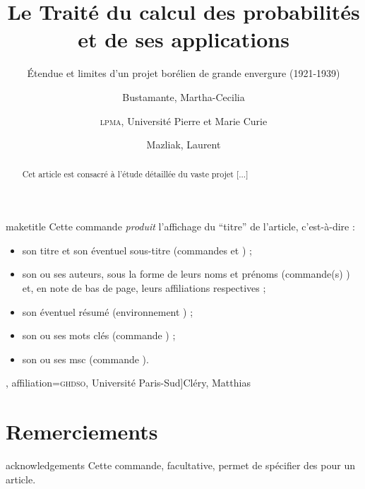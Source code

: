 \documentclass[french,nolocaltoc]{nwejmart}
\newtheorem[style=definition]{fait}
\newtheorem[title=contraventionnalisation]{ctrv}
\newtheorem[title-plural=anneaux]{anneau}
\newtheorem[title-plural=idéaux]{idéal}
\begin{document}
\begin{docCommand}[doc description=\mandatory]{maketitle}{}
  Cette commande \emph{produit} l'affichage du \enquote{titre} de l'article,
  c'est-à-dire :
  \begin{itemize}
  \item son titre et son éventuel sous-titre (commandes  et
    ) ;
  \item son ou ses auteurs, sous la forme de leurs noms et prénoms (commande(s)
    ) et, en note de bas de page, leurs affiliations respectives ;
  \item son éventuel résumé (environnement ) ;
  \item son ou ses mots clés (commande ) ;
  \item son ou ses \acrshort{msc} (commande ).
  \end{itemize}
\end{docCommand}

\begin{bodycode}[listing options={deletekeywords={[2]title,article},deletekeywords={[5]keywords}}]
\title[Le Traité du calcul des probabilités]{Le Traité du calcul des
  probabilités et de ses applications}
\subtitle[Étendue et limites d'un projet borélien]{Étendue et
  limites d'un projet borélien de grande envergure (1921-1939)}
%
\author[
  affiliation={Laboratoire \textsc{sphere}, Université Paris Diderot}
  ]{Bustamante, Martha-Cecilia}
\author[
  affiliation=[aff2]{\textsc{lpma}, Université Pierre et Marie Curie},
  affiliation={\textsc{ghdso}, Université Paris-Sud}]{Cléry, Matthias}
\author[
  affiliationtagged={aff2}
]{Mazliak, Laurent}
%
\begin{abstract}
  Cet article est consacré à l'étude détaillée du vaste projet [...]
\end{abstract}
%
%
\maketitle
\end{bodycode}

\section{Remerciements}
\label{sec:remerciements}

\begin{docCommand}{acknowledgements}{}
  Cette commande, facultative, permet de spécifier des  pour
  un article.
\end{docCommand}
\end{document}
